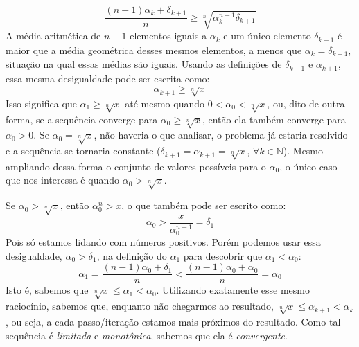 \documentclass{article}
\begin{document}
\[
  \dfrac{(n-1) \alpha_k + \delta_{k+1}}{n} \ge
  \sqrt[n]{\alpha_k^{n-1} \delta_{k+1}}
\]
A média aritmética de $n-1$ elementos iguais a $\alpha_k$
e um único elemento $\delta_{k+1}$
é maior que a média geométrica desses mesmos elementos,
a menos que $\alpha_k = \delta_{k+1}$,
situação na qual essas médias são iguais.
Usando as definições de $\delta_{k+1}$ e $\alpha_{k+1}$,
essa mesma desigualdade pode ser escrita como:
\[\alpha_{k+1} \ge \sqrt[n]{x}\]
Isso significa que $\alpha_1 \ge \sqrt[n]{x}$
até mesmo quando $0 < \alpha_0 < \sqrt[n]{x}$,
ou, dito de outra forma,
se a sequência converge para $\alpha_0 \ge \sqrt[n]{x}$,
então ela também converge para $\alpha_0 > 0$.
Se $\alpha_0 = \sqrt[n]{x}$, não haveria o que analisar,
o problema já estaria resolvido
e a sequência se tornaria constante
($\delta_{k+1} = \alpha_{k+1} = \sqrt[n]{x}$,
 $\forall k \in \mathds{N}$).
Mesmo ampliando dessa forma
o conjunto de valores possíveis para o $\alpha_0$,
o único caso que nos interessa é quando $\alpha_0 > \sqrt[n]{x}$.

Se $\alpha_0 > \sqrt[n]{x}$,
então $\alpha_0^n > x$,
o que também pode ser escrito como:
\[\alpha_0 > \dfrac{x}{\alpha_0^{n-1}} = \delta_1\]
Pois só estamos lidando com números positivos.
Porém podemos usar essa desigualdade, $\alpha_0 > \delta_1$,
na definição do $\alpha_1$
para descobrir que $\alpha_1 < \alpha_0$:
\[
  \alpha_1 = \dfrac{(n-1) \alpha_0 + \delta_1}{n}
  < \dfrac{(n-1) \alpha_0 + \alpha_0}{n} = \alpha_0
\]
Isto é, sabemos que $\sqrt[n]{x} \le \alpha_1 < \alpha_0$.
Utilizando exatamente esse mesmo raciocínio,
sabemos que, enquanto não chegarmos ao resultado,
$\sqrt[n]{x} \le \alpha_{k+1} < \alpha_k$,
ou seja, a cada passo/iteração estamos mais próximos do resultado.
Como tal sequência é \emph{limitada} e \emph{monotônica},
sabemos que ela é \emph{convergente}.
\end{document}
